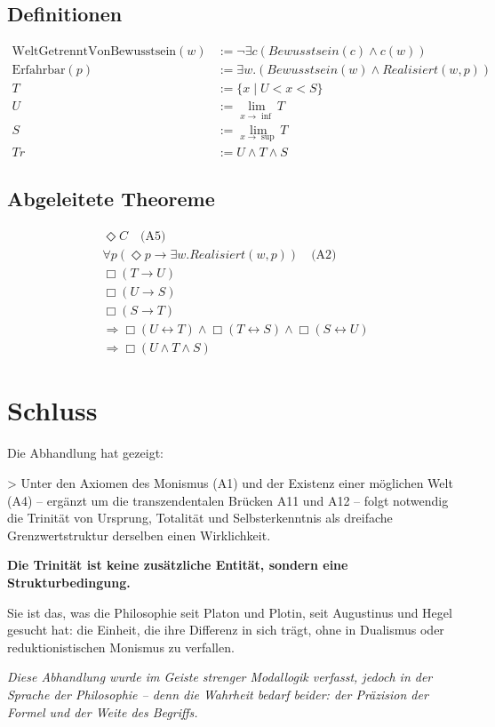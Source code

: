 \documentclass[
]{article}
\begin{document}
\subsection{Definitionen}\label{definitionen}

\[
\begin{aligned}
\text{WeltGetrenntVonBewusstsein}(w) &:= \neg \exists c (Bewusstsein(c) \land c(w)) \\
\text{Erfahrbar}(p) &:= \exists w. (Bewusstsein(w) \land Realisiert(w, p)) \\
T &:= \{ x \mid U < x < S \} \\
U &:= \lim_{x \to \inf} T \\
S &:= \lim_{x \to \sup} T \\
Tr &:= U \land T \land S
\end{aligned}
\]

\subsection{Abgeleitete Theoreme}\label{abgeleitete-theoreme}

\[
\begin{aligned}
& \Diamond C \quad \text{(A5)} \\
& \forall p(\Diamond p \rightarrow \exists w. Realisiert(w,p)) \quad \text{(A2)} \\
& \Box(T \rightarrow U) \\
& \Box(U \rightarrow S) \\
& \Box(S \rightarrow T) \\
& \Rightarrow \Box(U \leftrightarrow T) \land \Box(T \leftrightarrow S) \land \Box(S \leftrightarrow U) \\
& \Rightarrow \Box(U \land T \land S)
\end{aligned}
\]

\section{Schluss}\label{schluss}

Die Abhandlung hat gezeigt:

> Unter den Axiomen des Monismus (A1) und der Existenz einer möglichen Welt (A4) – ergänzt um die transzendentalen Brücken A11 und A12 – folgt notwendig die Trinität von Ursprung, Totalität und Selbsterkenntnis als dreifache Grenzwertstruktur derselben einen Wirklichkeit.

\textbf{Die Trinität ist keine zusätzliche Entität, sondern eine Strukturbedingung.}

Sie ist das, was die Philosophie seit Platon und Plotin, seit Augustinus und Hegel gesucht hat: die Einheit, die ihre Differenz in sich trägt, ohne in Dualismus oder reduktionistischen Monismus zu verfallen.

\begin{center}
\emph{Diese Abhandlung wurde im Geiste strenger Modallogik verfasst, jedoch in der Sprache der Philosophie – denn die Wahrheit bedarf beider: der Präzision der Formel und der Weite des Begriffs.}
\end{center}
\end{document}
